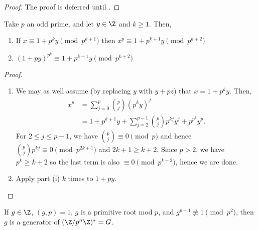 \documentclass{article}
\begin{document}
\begin{proof}
    The proof is deferred until .
\end{proof}

\begin{nlemma}\label{lem:2_10}
    Take $p$ an odd prime, and let $y \in \Z$ and $k \geq 1$. Then,
    \begin{enumerate}[label=(\roman*)]
        \item If $x \equiv 1 + p^k y \pmod{p^{k+1}}$ then $x^p \equiv 1 + p^{k+1} y \pmod{p^{k+2}}$
        \item $(1 + p y)^{p^k} \equiv 1 + p^{k+1} y \pmod{p^{k+2}}$
    \end{enumerate}
\end{nlemma}

\begin{proof}
    \leavevmode
    \begin{enumerate}[label=(\roman*)]
        \item We may as well assume (by replacing $y$ with $y + pz$) that $x = 1 + p^k y$. Then,
            \begin{align*}
                x^p &= \sum_{j=0}^p \binom{p}{j} (p^k y)^j \\
                    &= 1 + p^{k+1} y + \sum_{j=2}^{p-1} \binom{p}{j} p^{kj} y^j + p^{p^k} y^p.
            \end{align*}
            For $2 \leq j \leq p-1$, we have $\binom{p}{j} \equiv 0 \pmod{p}$ and hence $\binom{p}{j} p^{kj} \equiv 0 \pmod{p^{2k+1}}$ and $2k+1 \geq k+2$.
            Since $p > 2$, we have $p^k \geq k+2$ so the last term is also $\equiv 0 \pmod{p^{k+2}}$, hence we are done.

        \item Apply part (i) $k$ times to $1 + py$.
    \end{enumerate}
\end{proof}

\begin{nlemma}\label{lem:2_11}
    If $g \in \Z$, $(g, p) = 1$, $g$ is a primitive root mod $p$, and $g^{p-1} \not\equiv 1 \pmod{p^2}$, then $g$ is a generator of $(\Z/p^n \Z)^* = G$.
\end{nlemma}
\end{document}
